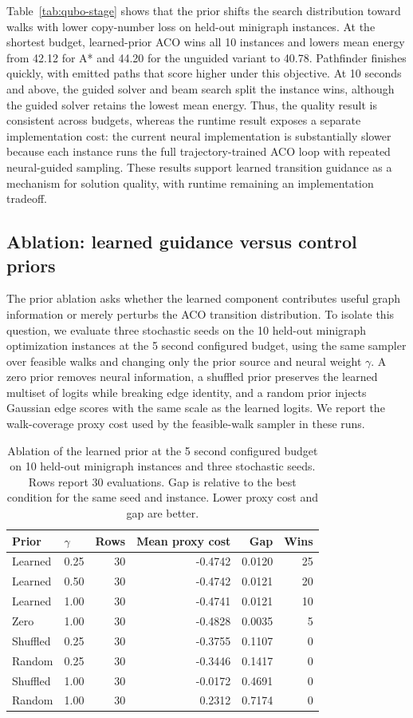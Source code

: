\documentclass[11pt]{article}
\begin{document}
Table~\ref{tab:qubo-stage} shows that the prior shifts the search distribution toward walks with lower copy-number loss on held-out minigraph instances. At the shortest budget, learned-prior ACO wins all 10 instances and lowers mean energy from 42.12 for A* and 44.20 for the unguided variant to 40.78. Pathfinder finishes quickly, with emitted paths that score higher under this objective. At 10 seconds and above, the guided solver and beam search split the instance wins, although the guided solver retains the lowest mean energy. Thus, the quality result is consistent across budgets, whereas the runtime result exposes a separate implementation cost: the current neural implementation is substantially slower because each instance runs the full trajectory-trained ACO loop with repeated neural-guided sampling. These results support learned transition guidance as a mechanism for solution quality, with runtime remaining an implementation tradeoff.

\subsection{Ablation: learned guidance versus control priors}

The prior ablation asks whether the learned component contributes useful graph information or merely perturbs the ACO transition distribution. To isolate this question, we evaluate three stochastic seeds on the 10 held-out minigraph optimization instances at the 5 second configured budget, using the same sampler over feasible walks and changing only the prior source and neural weight $\gamma$. A zero prior removes neural information, a shuffled prior preserves the learned multiset of logits while breaking edge identity, and a random prior injects Gaussian edge scores with the same scale as the learned logits. We report the walk-coverage proxy cost used by the feasible-walk sampler in these runs.

\begin{table}[t]
\centering
\small
\caption{Ablation of the learned prior at the 5 second configured budget on 10 held-out minigraph instances and three stochastic seeds. Rows report 30 evaluations. Gap is relative to the best condition for the same seed and instance. Lower proxy cost and gap are better.}
\label{tab:prior-ablation}
\begin{tabular}{llrrrr}
\hline
Prior & $\gamma$ & Rows & Mean proxy cost & Gap & Wins \\
\hline
Learned & 0.25 & 30 & -0.4742 & 0.0120 & 25 \\
Learned & 0.50 & 30 & -0.4742 & 0.0121 & 20 \\
Learned & 1.00 & 30 & -0.4741 & 0.0121 & 10 \\
Zero & 1.00 & 30 & -0.4828 & 0.0035 & 5 \\
Shuffled & 0.25 & 30 & -0.3755 & 0.1107 & 0 \\
Random & 0.25 & 30 & -0.3446 & 0.1417 & 0 \\
Shuffled & 1.00 & 30 & -0.0172 & 0.4691 & 0 \\
Random & 1.00 & 30 & 0.2312 & 0.7174 & 0 \\
\hline
\end{tabular}
\end{table}
\end{document}
